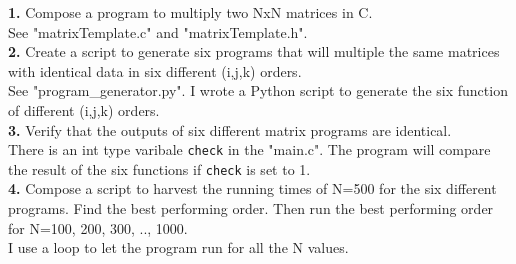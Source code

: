 \documentclass{article}
\begin{document}
\noindent\textbf{1.} Compose a program to multiply two NxN matrices in C.\\
\indent See "matrixTemplate.c" and "matrixTemplate.h".\\

\noindent\textbf{2.} Create a script to generate six programs that will multiple the same matrices with identical data in six different (i,j,k) orders.\\
\indent See "program\_generator.py". I wrote a Python script to generate the six function of different (i,j,k) orders.\\

\noindent\textbf{3.} Verify that the outputs of six different matrix programs are identical.\\
\indent There is an int type varibale \texttt{check} in the "main.c". The program will compare the result of the six functions if \texttt{check} is set to 1.\\

\noindent\textbf{4.} Compose a script to harvest the running times of N=500 for the six different programs. Find the best performing order. Then run the best performing order for N=100, 200, 300, .., 1000.\\
\indent I use a loop to let the program run for all the N values.\\
\end{document}
